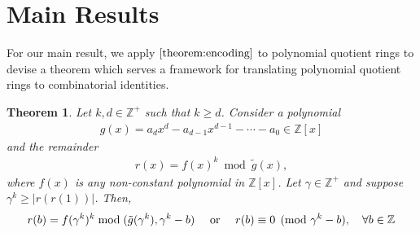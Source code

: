 \documentclass[12pt,reqno]{article}
\theoremstyle{plain}
\newtheorem{theorem}{Theorem}
\theoremstyle{definition}
\begin{document}
\section{Main Results} \label{section:results}
For our main result, we apply $\cref{theorem:encoding}$ to polynomial quotient rings to devise a theorem which serves a framework for translating polynomial quotient rings to combinatorial identities.

\begin{theorem} \label{theorem:kroneckerqrings}
Let $k, d \in \mathbb{Z}^+$ such that $k \geq d$. Consider a polynomial
\begin{align*}
g(x) = a_d x^d - a_{d-1} x^{d-1} - \cdots - a_0 \in \mathbb{Z}[x]
\end{align*}
and the remainder
\begin{align*}
r(x) = f(x)^k  \bmod{\tilde{g}(x)} ,
\end{align*}
where $f(x)$ is any non-constant polynomial in $\mathbb{Z}[x]$. Let $\gamma \in \mathbb{Z}^+$ and suppose $\gamma^k \geq |r(r(1))|$. Then,
\begin{align*}
r(b) = f(\gamma^k)^k \bmod{(\tilde{g}(\gamma^k), \gamma^k - b)} \quad \textup{ or } \quad r(b) \equiv 0 \pmod{\gamma^k - b}, \quad \forall b \in \mathbb{Z}
\end{align*}

\end{theorem}
\end{document}
